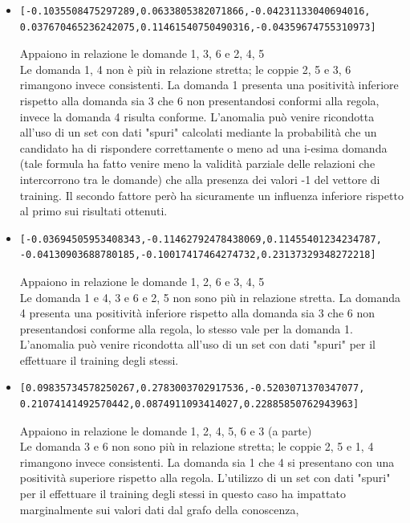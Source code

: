 \documentclass[10pt,a4paper]{article}
\begin{document}
\begin{itemize}
\item  \begin{verbatim}[-0.1035508475297289,0.0633805382071866,-0.04231133040694016,
0.037670465236242075,0.11461540750490316,-0.04359674755310973]\end{verbatim}
Appaiono in relazione le domande 1, 3, 6 e 2, 4, 5\\
Le domanda 1, 4 non \`e pi\`u in relazione stretta; le coppie 2, 5 e 3, 6 rimangono invece consistenti. La domanda 1 presenta una positivit\`a inferiore rispetto alla domanda sia 3 che 6 non presentandosi conformi alla regola, invece la domanda 4 risulta conforme. L'anomalia pu\`o venire ricondotta all'uso di un set con dati "spuri" calcolati mediante la probabilit\`a che un candidato ha di rispondere correttamente o meno ad una i-esima domanda (tale formula ha fatto venire meno la validit\`a parziale delle relazioni che intercorrono tra le domande) che alla presenza dei valori -1 del vettore di training. Il secondo fattore per\`o ha sicuramente un influenza inferiore rispetto al primo sui risultati ottenuti.

\item  \begin{verbatim}[-0.03694505953408343,-0.11462792478438069,0.11455401234234787,
-0.04130903688780185,-0.10017417464274732,0.23137329348272218]\end{verbatim}
Appaiono in relazione le domande 1, 2, 6 e 3, 4, 5\\
Le domanda 1 e 4, 3 e 6 e 2, 5  non sono pi\`u in relazione stretta. La domanda 4 presenta una positivit\`a inferiore rispetto alla domanda sia 3 che 6 non presentandosi conforme alla regola, lo stesso vale per la domanda 1. L'anomalia pu\`o venire ricondotta all'uso di un set con dati "spuri" per il effettuare il training degli stessi.

\item  \begin{verbatim}[0.09835734578250267,0.2783003702917536,-0.5203071370347077,
0.21074141492570442,0.0874911093414027,0.22885850762943963]\end{verbatim}
Appaiono in relazione le domande 1, 2, 4, 5, 6 e 3 (a parte)\\
Le domanda 3 e 6  non sono pi\`u in relazione stretta; le coppie 2, 5 e 1, 4 rimangono invece consistenti. La domanda sia 1 che 4 si presentano con una positivit\`a superiore rispetto alla regola. L'utilizzo di  un set con dati "spuri" per il effettuare il training degli stessi in questo caso ha impattato marginalmente sui valori dati dal grafo della conoscenza,


\end{itemize}
\end{document}
